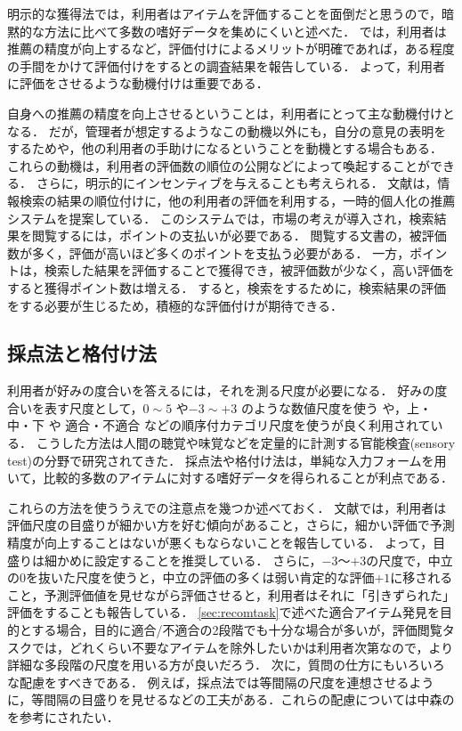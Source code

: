 明示的な獲得法では，利用者はアイテムを評価することを面倒だと思うので，暗黙的な方法に比べて多数の嗜好データを集めにくいと述べた．
\cite{sigir:01:01}では，利用者は推薦の精度が向上するなど，評価付けによるメリットが明確であれば，ある程度の手間をかけて評価付けをするとの調査結果を報告している．
よって，利用者に評価をさせるような動機付けは重要である．

自身への推薦の精度を向上させるということは，利用者にとって主な動機付けとなる．
だが，管理者が想定するようなこの動機以外にも，自分の意見の表明をするためや，他の利用者の手助けになるということを動機とする場合もある\cite{jacm:04:01}．
これらの動機は，利用者の評価数の順位の公開などによって喚起することができる．
さらに，明示的にインセンティブを与えることも考えられる．
文献\cite{ieeem:07:05}は，情報検索の結果の順位付けに，他の利用者の評価を利用する，一時的個人化の推薦システムを提案している．
このシステムでは，市場の考えが導入され，検索結果を閲覧するには，ポイントの支払いが必要である．
閲覧する文書の，被評価数が多く，評価が高いほど多くのポイントを支払う必要がある．
一方，ポイントは，検索した結果を評価することで獲得でき，被評価数が少なく，高い評価をすると獲得ポイント数は増える．
すると，検索をするために，検索結果の評価をする必要が生じるため，積極的な評価付けが期待できる．

\subsection{採点法と格付け法}

利用者が好みの度合いを答えるには，それを測る尺度が必要になる．
好みの度合いを表す尺度として，$0\sim5$ や$-3\sim+3$ のような数値尺度を使う や，上・中・下 や 適合・不適合 などの順序付カテゴリ尺度を使う\cite{jb:015:00}が良く利用されている．
こうした方法は人間の聴覚や味覚などを定量的に計測する官能検査(sensory test)の分野で研究されてきた\cite{jb:016:00}．
採点法や格付け法は，単純な入力フォームを用いて，比較的多数のアイテムに対する嗜好データを得られることが利点である．

これらの方法を使ううえでの注意点を幾つか述べておく．
文献\cite{sigchi:03:02}では，利用者は評価尺度の目盛りが細かい方を好む傾向があること，さらに，細かい評価で予測精度が向上することはないが悪くもならないことを報告している．
よって，目盛りは細かめに設定することを推奨している．
さらに，${-}3$〜${+}3$の尺度で，中立の$0$を抜いた尺度を使うと，中立の評価の多くは弱い肯定的な評価$+1$に移されること，予測評価値を見せながら評価させると，利用者はそれに「引きずられた」評価をすることも報告している．
\ref{sec:recomtask}で述べた適合アイテム発見を目的とする場合，目的に適合/不適合の2段階でも十分な場合が多いが，評価閲覧タスクでは，どれくらい不要なアイテムを除外したいかは利用者次第なので，より詳細な多段階の尺度を用いる方が良いだろう．
次に，質問の仕方にもいろいろな配慮をすべきである．
例えば，採点法では等間隔の尺度を連想させるように，等間隔の目盛りを見せるなどの工夫がある．これらの配慮については中森の\cite{jb:022:00}を参考にされたい．

